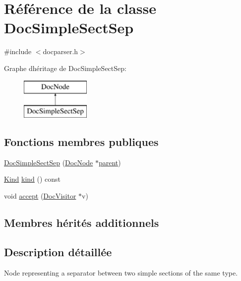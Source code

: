 \hypertarget{class_doc_simple_sect_sep}{}\section{Référence de la classe Doc\+Simple\+Sect\+Sep}
\label{class_doc_simple_sect_sep}


{\ttfamily \#include $<$docparser.\+h$>$}

Graphe d\textquotesingle{}héritage de Doc\+Simple\+Sect\+Sep\+:\begin{figure}[H]
\begin{center}
\leavevmode
\includegraphics[height=2.000000cm]{class_doc_simple_sect_sep}
\end{center}
\end{figure}
\subsection*{Fonctions membres publiques}
\begin{DoxyCompactItemize}
\item 
\hyperlink{class_doc_simple_sect_sep_ad7092c694033d0cb611ca80ff4dce6f5}{Doc\+Simple\+Sect\+Sep} (\hyperlink{class_doc_node}{Doc\+Node} $\ast$\hyperlink{class_doc_node_a990d8b983962776a647e6231d38bd329}{parent})
\item 
\hyperlink{class_doc_node_aebd16e89ca590d84cbd40543ea5faadb}{Kind} \hyperlink{class_doc_simple_sect_sep_a8ff7bd01c4efadd180b110dafa22dc5d}{kind} () const 
\item 
void \hyperlink{class_doc_simple_sect_sep_a75f9ed4d18c1fa4c83de3d9ef276bc7e}{accept} (\hyperlink{class_doc_visitor}{Doc\+Visitor} $\ast$v)
\end{DoxyCompactItemize}
\subsection*{Membres hérités additionnels}


\subsection{Description détaillée}
Node representing a separator between two simple sections of the same type. 

